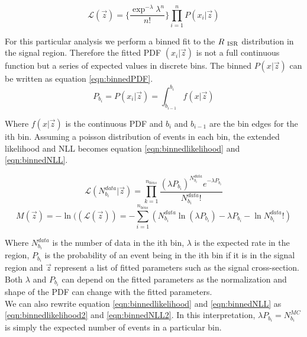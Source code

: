 \begin{equation}
\label{eqn:ExtLikelihood}
{\mathcal{L}}(\vec{z}) = \{ \frac{\exp^{-\lambda}{\lambda}^n}{n!} \}  {\displaystyle\prod_{i=1}^{n}} P(x_i|\vec{z})
\end{equation}

\indent For this particular analysis we perform a binned fit to the $R_{~\mathrm{ISR}}$ distribution in the signal region.  Therefore the fitted PDF $(x_i|\vec{z})$ is not a full continuous function but a series of expected values in discrete bins.  The binned $P(x|\vec{z})$ can be written as equation \ref{eqn:binnedPDF}. \\

\begin{equation}
\label{eqn:binnedPDF}
P_{b_i} = P(x_i|\vec{z}) = \int^{b_i}_{b_{i-1}} f(x|\vec{z})
\end{equation}

Where $f(x|\vec{z})$ is the continuous PDF and $b_i$ and $b_{i-1} $ are the bin edges for the ith bin. Assuming a poisson distribution of events in each bin, the extended likelihood and NLL becomes equation \ref{eqn:binnedlikelihood} and \ref{eqn:binnedNLL}.

\begin{equation}
\label{eqn:binnedlikelihood}
{\mathcal{L}}(N^{data}_{b_i}|\vec{z}) = {\displaystyle\prod_{k=1}^{n_{bins}} \frac{({\lambda}P_{b_i})^{N^{data}_{b_i}}e^{-{\lambda}P_{b_i}}}{N^{data}_{b_i}!}} 
\end{equation}
\begin{equation}
\label{eqn:binnedNLL}
M(\vec{z})=-\ln(({\mathcal{L}}(\vec{z})) = -{\displaystyle\sum_{i=1}^{n_{bins}}} ( N^{data}_{b_i} \ln( {\lambda}P_{b_i} ) - {\lambda}P_{b_i} - \ln{N^{data}_{b_i}!} )
\end{equation}

\indent Where $N^{data}_{b_i}$ is the number of data in the ith bin, $\lambda$ is the expected rate in the region, $P_{b_i}$ is the probability of an event being in the ith bin if it is in the signal region and $\vec{z}$ represent a list of fitted parameters such as the signal cross-section.   Both $\lambda$ and $P_{b_i}$ can depend on the fitted parameters as the normalization and shape of the PDF can change with the fitted parameters. \\

\indent We can also rewrite  equation \ref{eqn:binnedlikelihood} and \ref{eqn:binnedNLL} as \ref{eqn:binnedlikelihood2} and \ref{eqn:binnedNLL2}.  In this interpretation, ${\lambda}P_{b_i}=N^{MC}_{b_i}$ is simply the expected number of events in a particular bin.  \\

